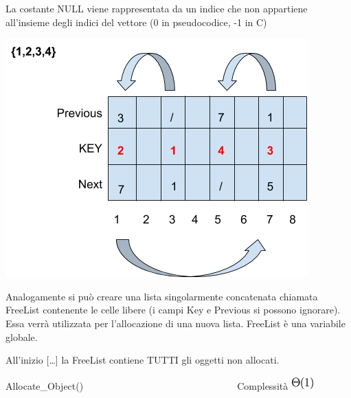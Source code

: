 \documentclass{article}
\begin{document}
{}

{La costante NULL viene rappresentata da un indice che non appartiene
all'insieme degli indici del vettore (0 in pseudocodice, -1 in C)}

{}

{\includegraphics{images/image520.png}}

{}

{}

{Analogamente si può creare una lista singolarmente concatenata chiamata
FreeList contenente le celle libere (i campi Key e Previous si possono
ignorare). Essa verrà utilizzata per l'allocazione di una nuova lista.
FreeList è una variabile globale.}

{}

{All'inizio {[}\ldots{}{]} la FreeList contiene TUTTI gli oggetti non
allocati.}

{}

{Allocate\_Object()~~~~~~~~~~~~~~~~~~~~~~~~~~~~~~~~}{Complessità
}\includegraphics{images/image69.png}



\protect\hypertarget{t.6867fb3c644d0c0b07e14f5253c873dd313c05de}{}{}\protect\hypertarget{t.3}{}{}
\end{document}
